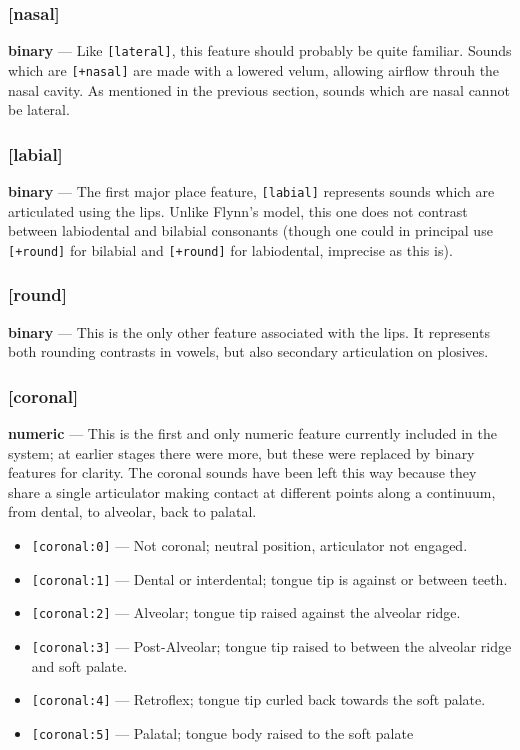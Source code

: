 \documentclass[10pt,letterpaper]{article}
\begin{document}
\subsubsection{[nasal]}
\label{ssub:feature_nasal}
\textbf{binary} — Like \texttt{[lateral]}, this feature should probably be quite familiar. Sounds which are \texttt{[+nasal]} are made with a lowered velum, allowing airflow throuh the nasal cavity. As mentioned in the previous section, sounds which are nasal cannot be lateral.

\subsubsection{[labial]}
\label{ssub:feature_labial}
\textbf{binary} — The first major place feature, \texttt{[labial]} represents sounds which are articulated using the lips. Unlike Flynn's model, this one does not contrast between labiodental and bilabial consonants (though one could in principal use \texttt{[+round]} for bilabial and \texttt{[+round]} for labiodental, imprecise as this is).

\subsubsection{[round]}
\label{ssub:feature_round}
\textbf{binary} — This is the only other feature associated with the lips. It represents both rounding contrasts in vowels, but also secondary articulation on plosives.

\subsubsection{[coronal]}	
\label{ssub:feature_coronal}
\textbf{numeric} — This is the first and only numeric feature currently included in the system; at earlier stages there were more, but these were replaced by binary features for clarity. The coronal sounds have been left this way because they share a single articulator making contact at different points along a continuum, from dental, to alveolar, back to palatal.

\begin{itemize}
  \item \texttt{[coronal:0]} — Not coronal; neutral position, articulator not engaged.
  \item \texttt{[coronal:1]} — Dental or interdental; tongue tip is against or between teeth.
  \item \texttt{[coronal:2]} — Alveolar; tongue tip raised against the alveolar ridge.
  \item \texttt{[coronal:3]} — Post-Alveolar; tongue tip raised to between the alveolar ridge and soft palate.
  \item \texttt{[coronal:4]} — Retroflex; tongue tip curled back towards the soft palate.
  \item \texttt{[coronal:5]} — Palatal; tongue body raised to the soft palate
\end{itemize}
\end{document}
